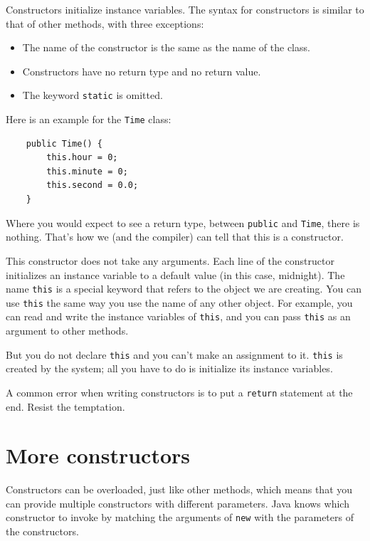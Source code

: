 \documentclass[12pt]{book}
\theoremstyle{exercise}
\begin{document}
Constructors initialize instance
variables.  The syntax for constructors is similar to that
of other methods, with three exceptions:

\begin{itemize}

\item The name of the constructor is the same as the name of
the class.

\item Constructors have no return type and no return value.

\item The keyword {\tt static} is omitted.

\end{itemize}

Here is an example for the {\tt Time} class:

\begin{lstlisting}
    public Time() {
        this.hour = 0;
        this.minute = 0;
        this.second = 0.0;
    }
\end{lstlisting}
%
Where you would expect to see a return type,
between {\tt public} and {\tt Time}, there is nothing.  That's
how we (and the compiler) can tell that this is a constructor.

This constructor does not take any arguments.  Each line of the
constructor initializes an instance variable to a default
value (in this case, midnight).  The name {\tt this} is a special
keyword that refers to the object we are creating.  You can use
{\tt this} the same way you use the name of any other object.  For
example, you can read and write the instance variables of {\tt this},
and you can pass {\tt this} as an argument to other methods.


But you do not declare {\tt this} and you can't make an
assignment to it.  {\tt this} is created by the system; all you
have to do is initialize its instance variables.

A common error when writing constructors is to put a {\tt return}
statement at the end.  Resist the temptation.


\section{More constructors}

Constructors can be overloaded, just like other methods,
which means that you can provide multiple constructors
with different parameters.  Java knows which constructor
to invoke by matching the arguments of {\tt new}
with the parameters of the constructors.
\end{document}
